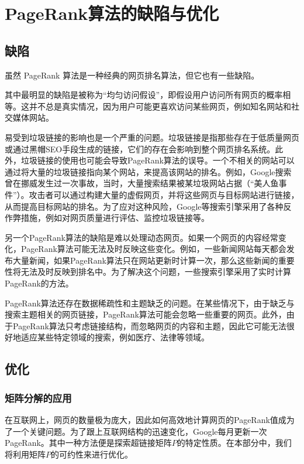 \documentclass[UTF8,openany]{ctexbook}
\begin{document}
\chapter[PageRank算法的缺陷与优化]{PageRank算法的缺陷与优化}
\thispagestyle{fancy}
\section[缺陷]{缺陷}
虽然 PageRank 算法是一种经典的网页排名算法，但它也有一些缺陷。

其中最明显的缺陷是被称为“均匀访问假设”，即假设用户访问所有网页的概率相等。这并不总是真实情况，因为用户可能更喜欢访问某些网页，例如知名网站和社交媒体网站。

易受到垃圾链接的影响也是一个严重的问题。垃圾链接是指那些存在于低质量网页或通过黑帽SEO手段生成的链接，它们的存在会影响到整个网页排名系统。此外，垃圾链接的使用也可能会导致PageRank算法的误导。一个不相关的网站可以通过将大量的垃圾链接指向某个网站，来提高该网站的排名。例如，Google搜索曾在挪威发生过一次事故，当时，大量搜索结果被某垃圾网站占据（“美人鱼事件”）。攻击者可以通过构建大量的虚假网页，并将这些网页与目标网站进行链接，从而提高目标网站的排名。为了应对这种风险，Google等搜索引擎采用了各种反作弊措施，例如对网页质量进行评估、监控垃圾链接等。

另一个PageRank算法的缺陷是难以处理动态网页。如果一个网页的内容经常变化，PageRank算法可能无法及时反映这些变化。例如，一些新闻网站每天都会发布大量新闻，如果PageRank算法只在网站更新时计算一次，那么这些新闻的重要性将无法及时反映到排名中。为了解决这个问题，一些搜索引擎采用了实时计算PageRank的方法。

PageRank算法还存在数据稀疏性和主题缺乏的问题。在某些情况下，由于缺乏与搜索主题相关的网页链接，PageRank算法可能会忽略一些重要的网页。此外，由于PageRank算法只考虑链接结构，而忽略网页的内容和主题，因此它可能无法很好地适应某些特定领域的搜索，例如医疗、法律等领域。



\section[优化]{优化}
\subsection[矩阵分解的应用]{矩阵分解的应用}
在互联网上，网页的数量极为庞大，因此如何高效地计算网页的PageRank值成为了一个关键问题。为了跟上互联网结构的迅速变化，Google每月更新一次PageRank。其中一种方法便是探索超链接矩阵$P$的特定性质\cite{bi:DGPOLS}。在本部分中，我们将利用矩阵$P$的可约性来进行优化。
\end{document}
